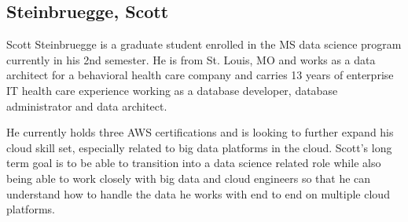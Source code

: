 \subsection{Steinbruegge, Scott}

Scott Steinbruegge is a graduate student enrolled in the MS data science program currently in his 2nd semester.  He is from St. Louis, MO and works as a data architect for a behavioral health care company and carries 13 years of enterprise IT health care experience working as a database developer, database administrator and data architect.

He currently holds three AWS certifications and is looking to further expand his cloud skill set, especially related to big data platforms in the cloud. Scott's long term goal is to be able to transition into a data science related role while also being able to work closely with big data and cloud engineers so that he can understand how to handle the data he works with end to end on multiple cloud platforms.
